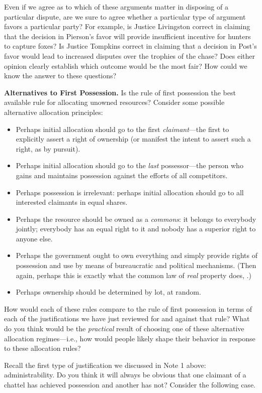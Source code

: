 Even if we agree as to which of these arguments matter in disposing of a
particular dispute, are we sure to agree whether a particular type of argument
favors a particular party? For example, is Justice Livingston correct in
claiming that the decision in Pierson's favor will provide insufficient
incentive for hunters to capture foxes? Is Justice Tompkins correct in claiming
that a decision in Post's favor would lead to increased disputes over the
trophies of the chase? Does either opinion clearly establish which outcome would
be the most fair? How could we know the answer to these questions?

\item \textbf{Alternatives to First Possession.} Is the rule of first possession
the best available rule for allocating unowned resources? Consider some possible
alternative allocation principles: 
\begin{itemize}
\item Perhaps initial allocation should go to the first \textit{claimant}---the
first to explicitly assert a right of ownership (or manifest the intent to
assert such a right, as by pursuit).
\item Perhaps initial allocation should go to the \textit{last} possessor---the
person who gains and maintains possession against the efforts of all
competitors. 
\item Perhaps possession is irrelevant: perhaps initial allocation should go to
all interested claimants in equal shares. 
\item Perhaps the resource should be owned as a \textit{commons}: it belongs to
everybody jointly; everybody has an equal right to it and nobody has a superior
right to anyone else.
\item Perhaps the government ought to own everything and simply provide rights
of possession and use by means of bureaucratic and political mechanisms. (Then
again, perhaps this is exactly what the common law of \textit{real} property
does, .)
\item Perhaps ownership should be determined by lot, at random. 
\end{itemize}
How would each of these rules compare to the rule of first possession in terms
of each of the justifications we have just reviewed for and against that rule?
What do you think would be the \textit{practical} result of choosing one of
these alternative allocation regimes---i.e., how would people likely shape their
behavior in response to these allocation rules?

\item Recall the first type of justification we discussed in Note 1 above:
administrability. Do you think it will always be obvious that one claimant of a
chattel has achieved possession and another has not? Consider the following
case.

